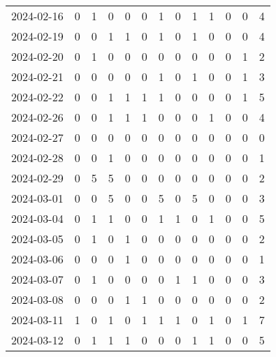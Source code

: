 \documentclass[dvipdfmx,oneside]{article}
\begin{document}
\begin{longtable}{lcccccccccccc}
        2024-02-16 &     0 &     1 &     0 &     0 &     0 &     1 &     0 &     1 &     1 &     0 &     0 &      4 \\
        2024-02-19 &     0 &     0 &     1 &     1 &     0 &     1 &     0 &     1 &     0 &     0 &     0 &      4 \\
        2024-02-20 &     0 &     1 &     0 &     0 &     0 &     0 &     0 &     0 &     0 &     0 &     1 &      2 \\
        2024-02-21 &     0 &     0 &     0 &     0 &     0 &     1 &     0 &     1 &     0 &     0 &     1 &      3 \\
        2024-02-22 &     0 &     0 &     1 &     1 &     1 &     1 &     0 &     0 &     0 &     0 &     1 &      5 \\
        2024-02-26 &     0 &     0 &     1 &     1 &     1 &     0 &     0 &     0 &     1 &     0 &     0 &      4 \\
        2024-02-27 &     0 &     0 &     0 &     0 &     0 &     0 &     0 &     0 &     0 &     0 &     0 &      0 \\
        2024-02-28 &     0 &     0 &     1 &     0 &     0 &     0 &     0 &     0 &     0 &     0 &     0 &      1 \\
        2024-02-29 &     0 &     5 &     5 &     0 &     0 &     0 &     0 &     0 &     0 &     0 &     0 &      2 \\
        2024-03-01 &     0 &     0 &     5 &     0 &     0 &     5 &     0 &     5 &     0 &     0 &     0 &      3 \\
        2024-03-04 &     0 &     1 &     1 &     0 &     0 &     1 &     1 &     0 &     1 &     0 &     0 &      5 \\
        2024-03-05 &     0 &     1 &     0 &     1 &     0 &     0 &     0 &     0 &     0 &     0 &     0 &      2 \\
        2024-03-06 &     0 &     0 &     0 &     1 &     0 &     0 &     0 &     0 &     0 &     0 &     0 &      1 \\
        2024-03-07 &     0 &     1 &     0 &     0 &     0 &     0 &     1 &     1 &     0 &     0 &     0 &      3 \\
        2024-03-08 &     0 &     0 &     0 &     1 &     1 &     0 &     0 &     0 &     0 &     0 &     0 &      2 \\
        2024-03-11 &     1 &     0 &     1 &     0 &     1 &     1 &     1 &     0 &     1 &     0 &     1 &      7 \\
        2024-03-12 &     0 &     1 &     1 &     1 &     0 &     0 &     0 &     1 &     1 &     0 &     0 &      5 \\

\end{longtable}
\end{document}
